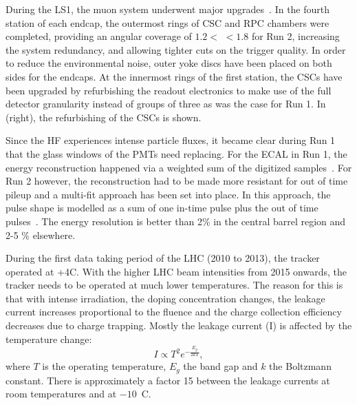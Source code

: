During the LS1, the  muon system underwent major upgrades~\cite{Guiducci:1966038,Battilana:2239185}. In the fourth station of each endcap, the outermost rings of CSC and RPC chambers were completed, providing an angular coverage of $1.2<$ \abspsrap $<1.8$ for Run 2, increasing the system redundancy, and allowing tighter cuts on the trigger quality. In order to reduce the environmental noise, outer yoke discs have been placed on both sides for the endcaps. 
At the innermost rings of the first station, the CSCs have been upgraded by refurbishing the readout electronics to make use of the full detector granularity instead of groups of three as was the case for Run 1. In  (right), the refurbishing of the CSCs is shown.

Since the HF experiences intense particle fluxes, it became clear during Run 1 that the glass windows of the PMTs need replacing. For the ECAL in Run 1, the energy reconstruction happened  via a weighted sum of the digitized samples~\cite{Chatrchyan:2013dga}. For Run 2 however, the reconstruction had to be made more resistant for out of time pileup and a multi-fit approach has been set into place. In this approach, the pulse shape is modelled as a sum of one in-time pulse plus the out of time pulses~\cite{1748-0221-12-01-C01069}. The energy resolution is better than 2\%  in the central barrel region and 2-5 \% elsewhere.

 During the first data taking period of the LHC (2010 to 2013), the tracker operated at +4\degree C. With the higher LHC beam intensities from 2015 onwards, the tracker needs to be operated at much lower temperatures. The reason for this is that with intense irradiation, the doping concentration changes, the leakage current increases proportional to the fluence and the charge collection efficiency decreases due to charge trapping. Mostly the leakage current (I) is affected by the temperature change: 
\begin{equation}
I \propto T^2 e^{-\frac{E_g}{2kT}}, 
\end{equation}
where $T$ is the operating temperature, $E_g$ the band gap and $k$ the Boltzmann constant. There is approximately a factor 15 between the leakage currents at room temperatures and at $-10$~\degree C. 


